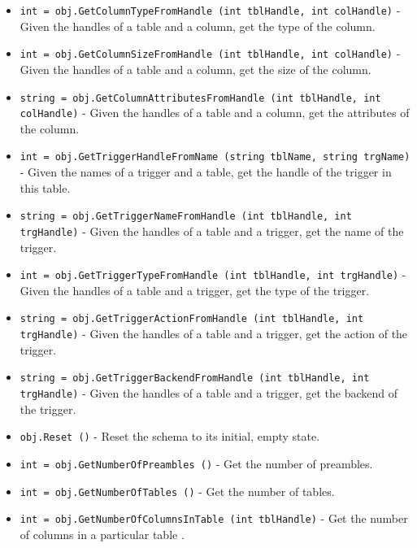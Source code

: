 \begin{itemize}
\item  \verb|int = obj.GetColumnTypeFromHandle (int tblHandle, int colHandle)| -  Given the handles of a table and a column, get the type of the column.

\item  \verb|int = obj.GetColumnSizeFromHandle (int tblHandle, int colHandle)| -  Given the handles of a table and a column, get the size of the column.

\item  \verb|string = obj.GetColumnAttributesFromHandle (int tblHandle, int colHandle)| -  Given the handles of a table and a column, get the attributes of the column.

\item  \verb|int = obj.GetTriggerHandleFromName (string tblName, string trgName)| -  Given the names of a trigger and a table, get the handle of the trigger in this table.

\item  \verb|string = obj.GetTriggerNameFromHandle (int tblHandle, int trgHandle)| -  Given the handles of a table and a trigger, get the name of the trigger.

\item  \verb|int = obj.GetTriggerTypeFromHandle (int tblHandle, int trgHandle)| -  Given the handles of a table and a trigger, get the type of the trigger.

\item  \verb|string = obj.GetTriggerActionFromHandle (int tblHandle, int trgHandle)| -  Given the handles of a table and a trigger, get the action of the trigger.

\item  \verb|string = obj.GetTriggerBackendFromHandle (int tblHandle, int trgHandle)| -  Given the handles of a table and a trigger, get the backend of the trigger.

\item  \verb|obj.Reset ()| -  Reset the schema to its initial, empty state.

\item  \verb|int = obj.GetNumberOfPreambles ()| -  Get the number of preambles.

\item  \verb|int = obj.GetNumberOfTables ()| -  Get the number of tables.

\item  \verb|int = obj.GetNumberOfColumnsInTable (int tblHandle)| -  Get the number of columns in a particular table .


\end{itemize}
